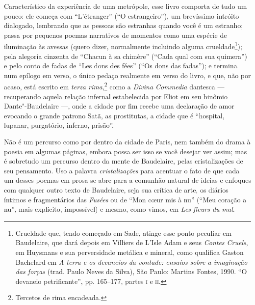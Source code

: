 
Característico da experiência de uma metrópole, esse livro comporta de tudo um pouco: ele começa com “L’étranger” (“O estrangeiro”), um
brevíssimo intróito dialogado, lembrando que as pessoas são estranhas
quando você é um estranho; passa por pequenos poemas narrativos de
momentos como uma espécie de iluminação às avessas (quero dizer,
normalmente incluindo alguma crueldade\footnote{ Crueldade que, tendo
começado em Sade, atinge esse ponto peculiar em Baudelaire, que dará
depois em Villiers de L’Isle Adam e seus \textit{Contes Cruels}, em Huysmans e
sua perversidade metálica e mineral, como qualifica Gaston Bachelard em
\textit{A terra e os devaneios da vontade: ensaios sobre a imaginação das
forças} (trad. Paulo Neves da Silva), São Paulo: Martins Fontes,
1990. “O devaneio petrificante”, pp. 165--177, partes \textsc{i} e \textsc{ii}.}); pela
alegoria cinzenta de “Chacun à sa chimère” (“Cada qual com sua quimera”)
e pelo conto de fadas de “Les dons des fées” (“Os dons das fadas”); e
termina num epílogo em verso, o único pedaço realmente em verso do
livro, e que, não por acaso, está escrito em \textit{terza
rima},\footnote{ Tercetos de rima encadeada.} como a \textit{Divina
Commedia} dantesca --- recuperando aquela relação infernal estabelecida
por Eliot em seu binômio Dante"-Baudelaire ---, onde a cidade por fim
recebe uma declaração de amor evocando o grande patrono Satã, as
prostitutas, a cidade que é “hospital, lupanar, purgatório, inferno,
prisão”.

Não é um percurso como por dentro da cidade de Paris, nem também do
drama à poesia em algumas páginas, embora possa ser isso se você
desejar ver assim; mas é sobretudo um percurso dentro da mente de
Baudelaire, pelas cristalizações de seu pensamento. Uso a palavra
\textit{cristalizações} para acentuar o fato de que cada um desses
poemas em prosa se abre para a comunhão natural de ideias e enfoques
com qualquer outro texto de Baudelaire, seja sua crítica de arte, os
diários íntimos e fragmentários das \textit{Fusées} ou de “Mon
c\oe ur mis à nu” (“Meu coração a nu”, mais explícito, impossível) e
mesmo, como vimos, em \textit{Les fleurs du mal}. 

